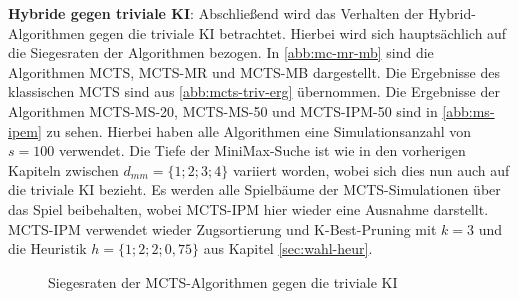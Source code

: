 \documentclass[12pt,a4paper,bibliography=totocnumbered,listof=totocnumbered]{article}
\begin{document}
\textbf{Hybride gegen triviale KI}: Abschließend wird das Verhalten der Hybrid-Algorithmen gegen die triviale KI betrachtet. Hierbei wird sich hauptsächlich auf die Siegesraten der Algorithmen bezogen. In \autoref{abb:mc-mr-mb} sind die Algorithmen MCTS, MCTS-MR und MCTS-MB dargestellt. Die Ergebnisse des klassischen MCTS sind aus \autoref{abb:mcts-triv-erg} übernommen. Die Ergebnisse der Algorithmen MCTS-MS-20, MCTS-MS-50 und MCTS-IPM-50 sind in \autoref{abb:ms-ipem} zu sehen. Hierbei haben alle Algorithmen eine Simulationsanzahl von $s=100$ verwendet. Die Tiefe der MiniMax-Suche ist wie in den vorherigen Kapiteln zwischen $d_{mm}=\{1;2;3;4\}$ variiert worden, wobei sich dies nun auch auf die triviale KI bezieht. Es werden alle Spielbäume der MCTS-Simulationen über das Spiel beibehalten, wobei MCTS-IPM hier wieder eine Ausnahme darstellt. MCTS-IPM verwendet wieder Zugsortierung und K-Best-Pruning mit $k=3$ und die Heuristik $h = \{1;2;2;0,75\}$ aus Kapitel \ref{sec:wahl-heur}.

\begin{figure} [h]
\centering
\begin{minipage}[b]{0.45\textwidth}
\centering
{}
\label{abb:mc-mr-mb}
\end{minipage}
\qquad
\begin{minipage}[b]{0.45\textwidth}
\centering
{}
\label{abb:ms-ipem}
\end{minipage}
\caption{Siegesraten der MCTS-Algorithmen gegen die triviale KI}
\label{abb:win_ms}
\end{figure}
\end{document}
